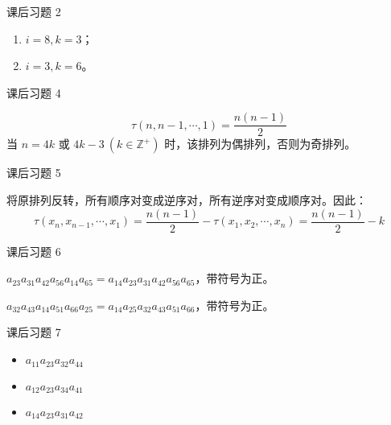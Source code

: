 \begin{problem}
	课后习题 2
	\begin{solution}
		\begin{enumerate}
			\item $i = 8, k = 3$；
			\item $i = 3, k = 6$。
		\end{enumerate}
	\end{solution}
\end{problem}

\begin{problem}
	课后习题 4
	\begin{solution}
		$$
		\tau(n,n-1,\cdots,1) = \frac{n(n-1)}{2}
		$$
		当 $n = 4k \text{ 或 } 4k-3\ (k \in \mathbb{Z}^+)$ 时，该排列为偶排列，否则为奇排列。
	\end{solution}
\end{problem}

\begin{problem}
	课后习题 5
	\begin{solution}
		将原排列反转，所有顺序对变成逆序对，所有逆序对变成顺序对。因此：
		$$
		\tau(x_n,x_{n-1},\cdots,x_1) = \frac{n(n-1)}{2} - \tau(x_1,x_2,\cdots,x_n) = \frac{n(n-1)}{2} - k
		$$
	\end{solution}
\end{problem}

\begin{problem}
	课后习题 6
	\begin{solution}
		$a_{23} a_{31} a_{42} a_{56} a_{14} a_{65} = a_{14} a_{23} a_{31} a_{42} a_{56} a_{65}$，带符号为正。

		$a_{32} a_{43} a_{14} a_{51} a_{66} a_{25} = a_{14} a_{25} a_{32} a_{43} a_{51} a_{66}$，带符号为正。
	\end{solution}
\end{problem}

\begin{problem}
	课后习题 7
	\begin{solution}
		\begin{itemize}
			\item $a_{11} a_{23} a_{32} a_{44}$
			\item $a_{12} a_{23} a_{34} a_{41}$
			\item $a_{14} a_{23} a_{31} a_{42}$
		\end{itemize}
	\end{solution}
\end{problem}

